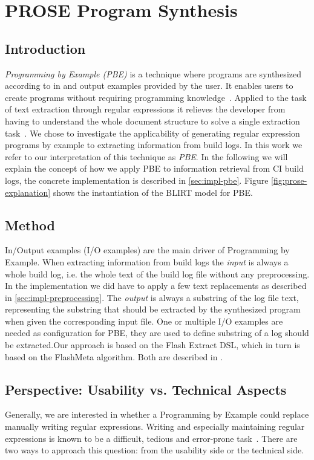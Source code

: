 \documentclass[\myrootdir/main.tex]{subfiles}
\begin{document}
\section{PROSE Program Synthesis}

\subsection{Introduction}
\emph{Programming by Example (PBE)} is a technique where programs are synthesized according to in and output examples provided by the user.
It enables users to create programs without requiring programming knowledge~\cite{mayer2015user}.
Applied to the task of text extraction through regular expressions it relieves the developer from having to understand the whole document structure to solve a single extraction task~\cite{le2014flashextract:}.
We chose to investigate the applicability of generating regular expression programs by example to extracting information from build logs.
In this work we refer to our interpretation of this technique as \emph{PBE}.
In the following we will explain the concept of how we apply PBE to information retrieval from CI build logs, the concrete implementation is described in \ref{sec:impl-pbe}.
Figure \ref{fig:prose-explanation} shows the instantiation of the BLIRT model for PBE.

\subsection{Method}
In/Output examples (I/O examples) are the main driver of Programming by Example.
When extracting information from build logs the \emph{input} is always a whole build log, i.e. the whole text of the build log file without any preprocessing.
In the implementation we did have to apply a few text replacements as described in \ref{sec:impl-preprocessing}.
The \emph{output} is always a substring of the log file text, representing the substring that should be extracted by the synthesized program when given the corresponding input file.
One or multiple I/O examples are needed as configuration for PBE, they are used to define substring of a log should be extracted.Our approach is based on the Flash Extract DSL, which in turn is based on the FlashMeta algorithm. Both are described in .

\subsection{Perspective: Usability vs. Technical Aspects}
Generally, we are interested in whether a Programming by Example could replace manually writing regular expressions.
Writing and especially maintaining regular expressions is known to be a difficult, tedious and error-prone task~\cite{michael2019regexes}.
There are two ways to approach this question: from the usability side or the technical side.
\end{document}
